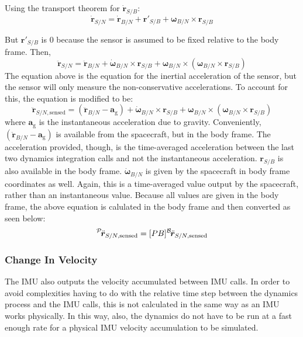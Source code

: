 Using the transport theorem for $\dot{\bm{r}}_{S/B}$:
\begin{equation}
	\dot{\bm{r}}_{S/N} = \dot{\bm{r}}_{B/N} + \bm{r}'_{S/B} + \bm{\omega}_{B/N} \times \bm{r}_{S/B}
	\label{eq:rDot}
\end{equation}

But $\bm{r}'_{S/B}$ is $0$ because the sensor is assumed to be fixed relative to the body frame. Then,
\begin{equation}
\ddot{\bm{r}}_{S/N} = \ddot{\bm{r}}_{B/N} + \dot{\bm{\omega}}_{B/N} \times \bm{r}_{S/B} +  \bm{\omega}_{B/N} \times (\bm{\omega}_{B/N} \times \bm{r}_{S/B})
\end{equation}
The equation above is the equation for the inertial acceleration of the sensor, but the sensor will only measure the non-conservative accelerations. To account for this, the equation is modified to be:
\begin{equation}
\ddot{\bm{r}}_{S/N, \textrm{sensed}} = (\ddot{\bm{r}}_{B/N} - \bm{a}_\textrm{g}) + \dot{\bm{\omega}}_{B/N} \times \bm{r}_{S/B} +  \bm{\omega}_{B/N} \times (\bm{\omega}_{B/N} \times \bm{r}_{S/B})
\end{equation}
where $\bm{a}_\textrm{g}$ is the instantaneous acceleration due to gravity. Conveniently, $(\ddot{\bm{r}}_{B/N} - \bm{a}_\textrm{g})$ is available from the spacecraft, but in the body frame. The acceleration provided, though, is the time-averaged acceleration between the last two dynamics integration calls and not the instantaneous acceleration. $\bm{r}_{S/B}$ is also available in the body frame. $\dot{\bm{\omega}}_{B/N}$ is given by the spacecraft in body frame coordinates as well. Again, this is a time-averaged value output by the spacecraft, rather than an instantaneous value. Because all values are given in the body frame, the above equation is calulated in the body frame and then converted as seen below:
\begin{equation}
	\leftexp{P}{\ddot{\bm{r}}_{S/N, \textrm{sensed}}} = [PB] \leftexp{B}{ \ddot{\bm{r}}_{S/N, \textrm{sensed}}}
\end{equation}

\subsubsection{Change In Velocity}
The IMU also outputs the velocity accumulated between IMU calls. In order to avoid complexities having to do with the relative time step between the dynamics process and the IMU calls, this is not calculated in the same way as an IMU works physically. In this way, also, the dynamics do not have to be run at a fast enough rate for a physical IMU velocity accumulation to be simulated.

